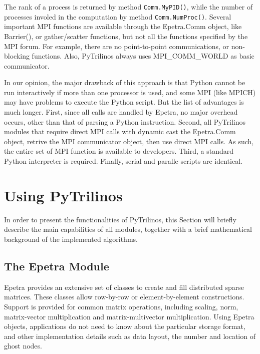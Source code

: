 \documentclass[10pt,relax]{SANDreport}
\begin{document}
The rank of a process is returned by method {\tt Comm.MyPID()}, while the
number of processes involed in the computation by method {\tt Comm.NumProc()}.
Several important MPI functions are available through the Epetra.Comm object,
  like Barrier(), or gather/scatter functions, but not all the functions
  specified by the MPI forum. For example, there are no point-to-point
  communications, or non-blocking functions. Also, PyTrilinos always uses
  MPI\_COMM\_WORLD as basic communicator.

In our opinion, the major drawback of this approach is that 
Python cannot be run interactively if more than one
processor is used, and some MPI (like MPICH) may have problems to execute the
Python script. But the list of advantages is much longer. First, since all
calls are handled by Epetra, no major overhead occurs, other than that of
parsing a Python instruction. Second, all PyTrilinos modules that require
direct MPI calls with dynamic cast the Epetra.Comm object, retrive the MPI
communicator object, then use direct MPI calls. As such, the entire set of MPI
function is available to developers. Third, a standard Python interpreter is
required. Finally, serial and paralle scripts are identical.

\section{Using PyTrilinos}
\label{sec:using}

In order to present the functionalities of PyTrilinos, this Section will
briefly describe the main capabilities of all modules, together with a brief
mathematical background of the implemented algorithms.

\subsection{The Epetra Module}
\label{subsec:epetra}

Epetra provides an extensive set of classes to create and fill
distributed sparse matrices. These classes allow row-by-row or
element-by-element constructions. Support is provided for common
matrix operations, including scaling, norm, matrix-vector
multiplication and matrix-multivector multiplication.  Using Epetra
objects, applications do not need to know about the particular storage
format, and other implementation details such as data layout, the
number and location of ghost nodes.
\end{document}
